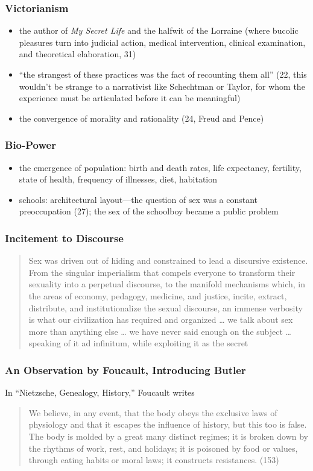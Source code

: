\documentclass[xcolor=dvipsnames]{beamer}
\begin{document}
\begin{frame}
  \frametitle{Victorianism}
  \begin{itemize}
  \item the author of \emph{My Secret Life} and the halfwit of the
    Lorraine (where bucolic pleasures turn into judicial action,
    medical intervention, clinical examination, and theoretical
    elaboration, 31)
  \item ``the strangest of these practices was the fact of recounting
    them all'' (22, this wouldn't be strange to a narrativist like
    Schechtman or Taylor, for whom the experience must be articulated
    before it can be meaningful)
  \item the convergence of morality and rationality (24, Freud and Pence)
  \end{itemize}
\end{frame}

\begin{frame}
  \frametitle{Bio-Power}
  \begin{itemize}
  \item the emergence of population: birth and death rates, life
    expectancy, fertility, state of health, frequency of illnesses,
    diet, habitation
  \item schools: architectural layout---the question of sex was a
    constant preoccupation (27); the sex of the schoolboy became a
    public problem
  \end{itemize}
\end{frame}

\begin{frame}
  \frametitle{Incitement to Discourse}
  \begin{quote}
    Sex was driven out of hiding and constrained to lead a discursive
    existence. From the singular imperialism that compels everyone to
    transform their sexuality into a perpetual discourse, to the
    manifold mechanisms which, in the areas of economy, pedagogy,
    medicine, and justice, incite, extract, distribute, and
    institutionalize the sexual discourse, an immense verbosity is
    what our civilization has required and organized {\ldots} we talk
    about sex more than anything else {\ldots} we have never said
    enough on the subject {\ldots} speaking of it ad infinitum, while
    exploiting it as the secret
  \end{quote}
\end{frame}

\begin{frame}
  \frametitle{An Observation by Foucault, Introducing Butler}
  In ``Nietzsche, Genealogy, History,'' Foucault writes
  \begin{quote}
    We believe, in any event, that the body obeys the exclusive laws
    of physiology and that it escapes the influence of history, but
    this too is false. The body is molded by a great many distinct
    regimes; it is broken down by the rhythms of work, rest, and
    holidays; it is poisoned by food or values, through eating habits
    or moral laws; it constructs resistances. (153)
  \end{quote}
\end{frame}
\end{document}
